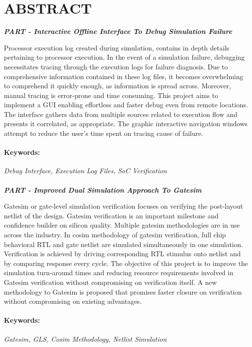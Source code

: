 \section*{\centering ABSTRACT}
\newcommand{\RNum}[1]{\uppercase\expandafter{\romannumeral #1\relax}}


\centerline{\emph{\bf PART \RNum{1}- Interactive Offline Interface To Debug Simulation Failure }}
\vspace{5pt}
Processor execution log created during simulation, contains in depth details pertaining to processor execution.  In the event of a simulation failure, debugging necessitates tracing through the execution logs for failure diagnosis.  Due to comprehensive information contained in these log files, it becomes overwhelming to comprehend it quickly enough, as information is spread across. Moreover, manual tracing is error-prone and time consuming.
This project aims to implement a GUI  enabling effortless and faster debug even from remote locations. The interface gathers data from multiple sources related to execution flow and presents it correlated, as appropriate. The graphic interactive navigation windows attempt to reduce the user's time spent on tracing cause of failure.



\paragraph{Keywords:}
 \emph{Debug Interface, Execution Log Files, SoC  Verification}


 \paragraph{}

\centerline{\emph{\bf PART \RNum{2}- Improved Dual Simulation Approach To Gatesim}}
\vspace{5pt}
Gatesim or gate-level simulation verification focuses on verifying the post-layout netlist of the design. Gatesim verification is an important milestone and confidence builder on silicon quality. Multiple gatesim methodologies are in use across the industry. In cosim methodology of gatesim verification, full chip behavioral RTL  and gate netlist are simulated simultaneously in one simulation. Verification is achieved by driving corresponding RTL stimulus onto netlist and by comparing response every cycle.
The objective of this project is to improve the simulation turn-around times and reducing resource requirements involved in Gatesim verification without compromising on verification itself. A new methodology to Gatesim is proposed that promises faster closure on verification without compromising on existing advantages.


\paragraph{Keywords:}
 \emph{Gatesim,  GLS,  Cosim Methodology, Netlist Simulation}




